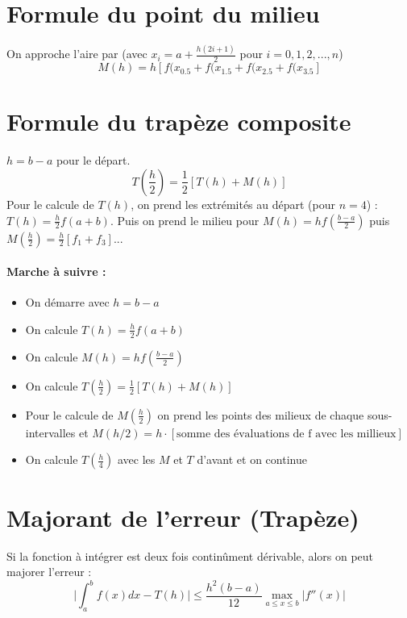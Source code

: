 \documentclass[a4paper,9pt]{extarticle}
\begin{document}
\begin{multicols*}{2}
\section{Formule du point du milieu}

On approche l'aire par (avec $x_i=a+\frac{h(2i+1)}{2}$ pour $i=0,1,2,...,n$)
$$
M(h)=h[f(x_{0.5}+f(x_{1.5}+f(x_{2.5}+f(x_{3.5}]
$$

\section{Formule du trapèze composite}
$h=b-a$ pour le départ.
$$
T(\frac{h}{2})=\frac{1}{2}[T(h)+M(h)]
$$
Pour le calcule de $T(h)$, on prend les extrémités au départ (pour $n=4$) : $T(h)=\frac{h}{2}f(a+b)$. Puis on prend le milieu pour $M(h)=hf(\frac{b-a}{2})$ puis $M(\frac{h}{2})=\frac{h}{2}[f_1+f_3]$...

\paragraph*{Marche à suivre :}
\begin{itemize}
    \item On démarre avec $h=b-a$
    \item On calcule $T(h)=\frac{h}{2}f(a+ b)$
    \item On calcule $M(h)=hf(\frac{b-a}{2})$
    \item On calcule $T(\frac{h}{2})=\frac{1}{2}[T(h)+M(h)]$
    \item Pour le calcule de $M(\frac{h}{2})$ on prend les points des milieux de chaque sous-intervalles et $M(h/2)=h\cdot[\text{somme des évaluations de f avec les millieux}]$
    \item On calcule $T(\frac{h}{4})$ avec les $M$ et $T$ d'avant et on continue
\end{itemize}

\section{Majorant de l'erreur (Trapèze)}
Si la fonction à intégrer est deux fois continûment dérivable, alors on peut majorer l'erreur :
$$
\Big|\int_a^bf(x)dx-T(h)\Big|\leq \frac{h^2(b-a)}{12} \max_{a\leq x \leq b}|f''(x)|
$$


\end{multicols*}
\end{document}
